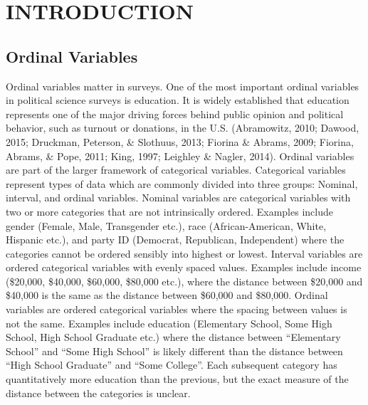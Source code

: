 \documentclass[12pt,econ]{sources/authesis}
\begin{document}
\begin{frontmatter}





\listoftables

\listoffigures

\tableofcontents


\end{frontmatter}

\hypertarget{intro}{%
\chapter{INTRODUCTION}\label{intro}}

\hypertarget{intro-ordinal}{%
\section{Ordinal Variables}\label{intro-ordinal}}

Ordinal variables matter in surveys. One of the most important ordinal variables in political science surveys is education. It is widely established that education represents one of the major driving forces behind public opinion and political behavior, such as turnout or donations, in the U.S. (Abramowitz, 2010; Dawood, 2015; Druckman, Peterson, \& Slothuus, 2013; Fiorina \& Abrams, 2009; Fiorina, Abrams, \& Pope, 2011; King, 1997; Leighley \& Nagler, 2014). Ordinal variables are part of the larger framework of categorical variables. Categorical variables represent types of data which are commonly divided into three groups: Nominal, interval, and ordinal variables. Nominal variables are categorical variables with two or more categories that are not intrinsically ordered. Examples include gender (Female, Male, Transgender etc.), race (African-American, White, Hispanic etc.), and party ID (Democrat, Republican, Independent) where the categories cannot be ordered sensibly into highest or lowest. Interval variables are ordered categorical variables with evenly spaced values. Examples include income (\$20,000, \$40,000, \$60,000, \$80,000 etc.), where the distance between \$20,000 and \$40,000 is the same as the distance between \$60,000 and \$80,000. Ordinal variables are ordered categorical variables where the spacing between values is not the same. Examples include education (Elementary School, Some High School, High School Graduate etc.) where the distance between ``Elementary School'' and ``Some High School'' is likely different than the distance between ``High School Graduate'' and ``Some College''. Each subsequent category has quantitatively more education than the previous, but the exact measure of the distance between the categories is unclear.
\end{document}
